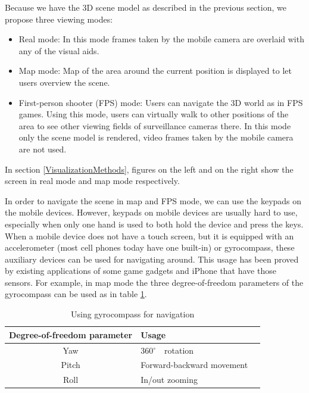 Because we have the 3D scene model as described in the previous section, we propose three viewing modes:

\begin{itemize}
	\item Real mode: In this mode frames taken by the mobile camera are overlaid with any of the visual aids.
	\item Map mode: Map of the area around the current position is displayed to let users overview the scene.
	\item First-person shooter (FPS) mode: Users can navigate the 3D world as in FPS games. Using this mode, users can virtually walk to other positions of the area to see other viewing fields of surveillance cameras there. In this mode only the scene model is rendered, video frames taken by the mobile camera are not used.
\end{itemize}

In section \ref{VisualizationMethods}, figures on the left and on the right show the screen in real mode and map mode respectively.

In order to navigate the scene in map and FPS mode, we can use the keypads on the mobile devices. However, keypads on mobile devices are usually hard to use, especially when only one hand is used to both hold the device and press the keys. When a mobile device does not have a touch screen, but it is equipped with an accelerometer (most cell phones today have one built-in) or gyrocompass, these auxiliary devices can be used for navigating around. This usage has been proved by existing applications of some game gadgets and iPhone that have those sensors. For example, in map mode the three degree-of-freedom parameters of the gyrocompass can be used as in table \ref{tb:GyrocompassNavigation}.

\begin{table}[tb]
	\begin{center}
		\caption{Using gyrocompass for navigation}
		\label{tb:GyrocompassNavigation}
		\begin{tabular}{|c|l|l|}
			\hline
			Degree-of-freedom parameter & Usage                     \\
			\hline
			Yaw                         & 360$^\circ$　rotation      \\
			Pitch                       & Forward-backward movement \\
			Roll                        & In/out zooming            \\
			\hline
		\end{tabular}
	\end{center}
\end{table}

